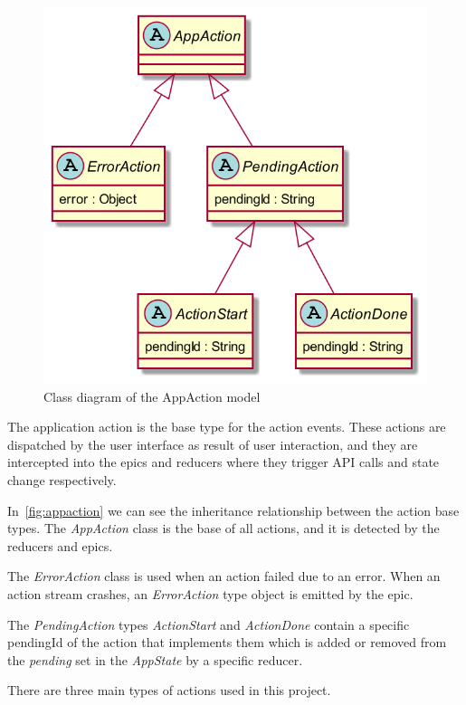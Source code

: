 \documentclass[a4paper,12pt]{report}
\begin{document}
\begin{figure}[H]
    \centering
    \includegraphics[scale=0.4]{diagrams/class/app_action.png}
    \caption{Class diagram of the AppAction model}\label{fig:appaction}
\end{figure}

The application action is the base type for the action events. These actions
are dispatched by the user interface as result of user interaction, and they
are intercepted into the epics and reducers where they trigger API calls and
state change respectively.

In~\autoref{fig:appaction} we can see the inheritance relationship between the
action base types. The \textit{AppAction} class is the base of all actions, and
it is detected by the reducers and epics.

The \textit{ErrorAction} class is used when an action failed due to an error.
When an action stream crashes, an \textit{ErrorAction} type object is emitted
by the epic.

The \textit{PendingAction} types \textit{ActionStart} and \textit{ActionDone}
contain a specific pendingId of the action that implements them which is added
or removed from the \textit{pending} set in the \textit{AppState} by a specific
reducer.

There are three main types of actions used in this project.
\end{document}
